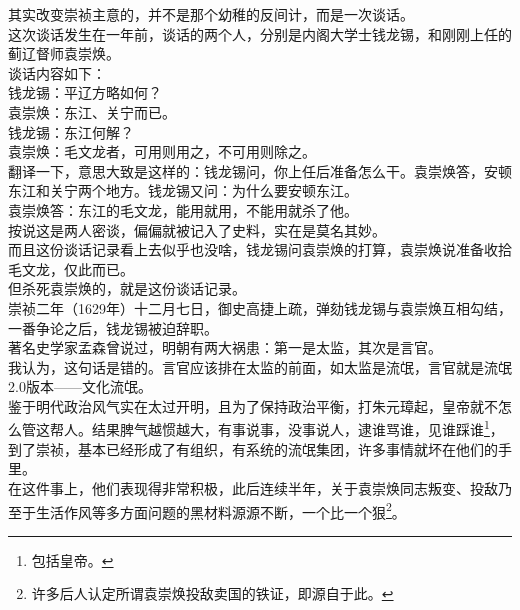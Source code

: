 \begin{multicols}{\theparacolNo}
其实改变崇祯主意的，并不是那个幼稚的反间计，而是一次谈话。\\

这次谈话发生在一年前，谈话的两个人，分别是内阁大学士钱龙锡，和刚刚上任的蓟辽督师袁崇焕。\\

谈话内容如下：\\

钱龙锡：平辽方略如何？\\

袁崇焕：东江、关宁而已。\\

钱龙锡：东江何解？\\

袁崇焕：毛文龙者，可用则用之，不可用则除之。\\

翻译一下，意思大致是这样的：钱龙锡问，你上任后准备怎么干。袁崇焕答，安顿东江和关宁两个地方。钱龙锡又问：为什么要安顿东江。\\

袁崇焕答：东江的毛文龙，能用就用，不能用就杀了他。\\

按说这是两人密谈，偏偏就被记入了史料，实在是莫名其妙。\\

而且这份谈话记录看上去似乎也没啥，钱龙锡问袁崇焕的打算，袁崇焕说准备收拾毛文龙，仅此而已。\\

但杀死袁崇焕的，就是这份谈话记录。\\

崇祯二年（1629年）十二月七日，御史高捷上疏，弹劾钱龙锡与袁崇焕互相勾结，一番争论之后，钱龙锡被迫辞职。\\

著名史学家孟森曾说过，明朝有两大祸患：第一是太监，其次是言官。\\

我认为，这句话是错的。言官应该排在太监的前面，如太监是流氓，言官就是流氓2.0版本——文化流氓。\\

鉴于明代政治风气实在太过开明，且为了保持政治平衡，打朱元璋起，皇帝就不怎么管这帮人。结果脾气越惯越大，有事说事，没事说人，逮谁骂谁，见谁踩谁\footnote{包括皇帝。}，到了崇祯，基本已经形成了有组织，有系统的流氓集团，许多事情就坏在他们的手里。\\

在这件事上，他们表现得非常积极，此后连续半年，关于袁崇焕同志叛变、投敌乃至于生活作风等多方面问题的黑材料源源不断，一个比一个狠\footnote{许多后人认定所谓袁崇焕投敌卖国的铁证，即源自于此。}。\\


\end{multicols}
